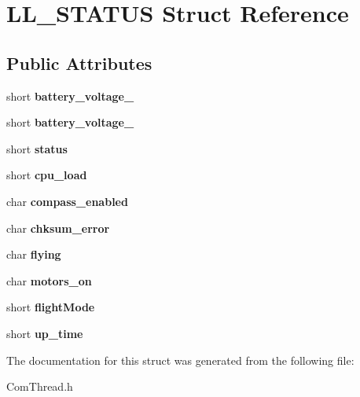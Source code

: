\hypertarget{struct_l_l___s_t_a_t_u_s}{\section{L\-L\-\_\-\-S\-T\-A\-T\-U\-S Struct Reference}
\label{struct_l_l___s_t_a_t_u_s}
}
\subsection*{Public Attributes}
\begin{DoxyCompactItemize}
\item 
\hypertarget{struct_l_l___s_t_a_t_u_s_a40f523f05879fdb2b34145d6cb2e2ae9}{short {\bfseries battery\-\_\-voltage\-\_}}\label{struct_l_l___s_t_a_t_u_s_a40f523f05879fdb2b34145d6cb2e2ae9}

\item 
\hypertarget{struct_l_l___s_t_a_t_u_s_a59962f9348b1d5b24c99d59ab928265a}{short {\bfseries battery\-\_\-voltage\-\_}}\label{struct_l_l___s_t_a_t_u_s_a59962f9348b1d5b24c99d59ab928265a}

\item 
\hypertarget{struct_l_l___s_t_a_t_u_s_ad5a71889ea6cf30fc761923a4683de06}{short {\bfseries status}}\label{struct_l_l___s_t_a_t_u_s_ad5a71889ea6cf30fc761923a4683de06}

\item 
\hypertarget{struct_l_l___s_t_a_t_u_s_a5c507f7dc9e5eaf4b1e366290cbf0937}{short {\bfseries cpu\-\_\-load}}\label{struct_l_l___s_t_a_t_u_s_a5c507f7dc9e5eaf4b1e366290cbf0937}

\item 
\hypertarget{struct_l_l___s_t_a_t_u_s_ad97973d2a7b078f4a766adf1e92348e1}{char {\bfseries compass\-\_\-enabled}}\label{struct_l_l___s_t_a_t_u_s_ad97973d2a7b078f4a766adf1e92348e1}

\item 
\hypertarget{struct_l_l___s_t_a_t_u_s_a5af7f9fad972f408a244bd0b67c35215}{char {\bfseries chksum\-\_\-error}}\label{struct_l_l___s_t_a_t_u_s_a5af7f9fad972f408a244bd0b67c35215}

\item 
\hypertarget{struct_l_l___s_t_a_t_u_s_adf20a4195fecce988e7075bc51046064}{char {\bfseries flying}}\label{struct_l_l___s_t_a_t_u_s_adf20a4195fecce988e7075bc51046064}

\item 
\hypertarget{struct_l_l___s_t_a_t_u_s_ac5422d2a352f0084d12b6f9511c45d58}{char {\bfseries motors\-\_\-on}}\label{struct_l_l___s_t_a_t_u_s_ac5422d2a352f0084d12b6f9511c45d58}

\item 
\hypertarget{struct_l_l___s_t_a_t_u_s_a34dd1ef37e67a5ee4a85bd03920ab061}{short {\bfseries flight\-Mode}}\label{struct_l_l___s_t_a_t_u_s_a34dd1ef37e67a5ee4a85bd03920ab061}

\item 
\hypertarget{struct_l_l___s_t_a_t_u_s_a93718130fd7bef62d8dc2008dfb2e913}{short {\bfseries up\-\_\-time}}\label{struct_l_l___s_t_a_t_u_s_a93718130fd7bef62d8dc2008dfb2e913}

\end{DoxyCompactItemize}


The documentation for this struct was generated from the following file\-:\begin{DoxyCompactItemize}
\item 
Com\-Thread.\-h\end{DoxyCompactItemize}
